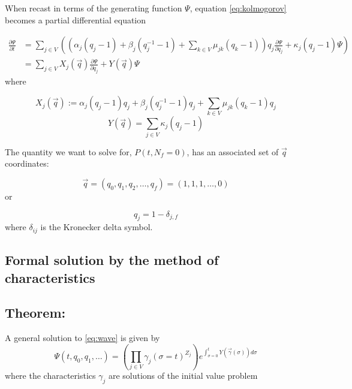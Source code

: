 \documentclass{article}
\begin{document}
When recast in terms of the generating function $\Psi$, equation
\eqref{eq:kolmogorov} becomes a partial differential equation

\begin{align}
    \frac{\partial \Psi}{\partial t} &= 
    \sum_{j \in V} \left(
    \left(
    \alpha_j (q_j - 1)
    + \beta_j (q_j^{-1} - 1)
    + \sum_{k \in V} \mu_{jk} (q_k - 1) 
    \right) q_j \frac{\partial  \Psi}{\partial q_j}
    +\kappa_j (q_j - 1)  \Psi \right)
    \nonumber \\
    &= \sum_{j \in V} X_j(\vec{q}) \frac{\partial \Psi}{\partial q_j}
    + Y(\vec{q}) \Psi 
    \label{eq:wave}
\end{align}
where

\begin{equation}
    X_j(\vec{q}) :=
    \alpha_j (q_j - 1) q_j
    + \beta_j (q_j^{-1} - 1) q_j
    + \sum_{k \in V} \mu_{jk} (q_k - 1) q_j
\end{equation}
\begin{equation}
    Y(\vec{q}) = \sum_{j \in V}\kappa_j (q_j - 1)
\end{equation}

The quantity we want to solve for, $P(t,N_f = 0)$, has an associated set of
$\vec{q}$ coordinates:

\begin{equation}
    \vec{q} = (q_0,q_1,q_2,\dots,q_f) = (1,1,1,\dots,0)
\end{equation}
or

\begin{equation}
    q_j = 1 - \delta_{j,f}
\end{equation}
where $\delta_{ij}$ is the Kronecker delta symbol.

\subsection{Formal solution by the method of characteristics}

\subsection*{Theorem:}


A general solution to \eqref{eq:wave} is given by
\begin{equation}
    \Psi(t,q_0,q_1,\dots) = \left(\prod_{j \in V}
    \gamma_j(\sigma=t)^{Z_j}\right)
    e^{\int_{\sigma=0}^t Y(\vec{\gamma}(\sigma)) d\sigma}
    \label{eq:formalsln}
\end{equation}
where the characteristics ${\gamma}_j$ are solutions of the initial value problem
\end{document}
